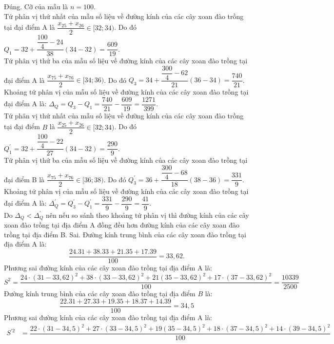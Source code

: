\begin{ex}
{\begin{itemchoice}
			\itemch Đúng. Cỡ của mẫu là ${n}=100$. \\
			Tứ phân vị thứ nhất của mẫu số liệu về đường kính của các cây xoan đào trồng tại đại điểm A là $\dfrac{{x}_{25}+{x}_{26}}{2} \in[32 ; 34)$. Do đó ${Q}_{1}=32+\dfrac{\dfrac{100}{4}-24}{38}(34-32)=\dfrac{609}{19}$. \\
			Tứ phân vị thứ ba của mẫu số liệu về đường kính của các cây xoan đào trồng tại đại điểm A là $\dfrac{{x}_{75}+{x}_{76}}{2} \in[34 ; 36)$. Do đó ${Q}_{3}=34+\dfrac{\dfrac{300}{4}-62}{21}(36-34)=\dfrac{740}{21}$. \\
			Khoảng tứ phân vị của mẫu số liệu về đường kính của các cây xoan đào trồng tại đại điểm A là:
			$\Delta_{Q}=Q_{3}-Q_{1}=\dfrac{740}{21}-\dfrac{609}{19}=\dfrac{1271}{399}$.\\
			Tứ phân vị thứ nhất của mẫu số liệu về đường kính của các cây xoan đào trồng tại đại điểm $B$ là $\dfrac{{x}_{25}+{x}_{26}}{2} \in[32 ; 34)$. Do đó ${Q}_{1}^{\prime}=32+\dfrac{\dfrac{100}{4}-22}{27}(34-32)=\dfrac{290}{9}$. \\
			Tứ phân vị thứ ba của mẫu số liệu về đường kính của các cây xoan đào trồng tại đại điểm B là $\dfrac{{x}_{75}+{x}_{76}}{2} \in[36 ; 38)$. Do đó ${Q}_{3}^{\prime}=36+\dfrac{\dfrac{300}{4}-68}{18}(38-36)=\dfrac{331}{9}$.\\
			Khoảng tứ phân vị của mẫu số liệu về đường kính của các cây xoan đào trồng tại đại điểm A là: $\Delta_{Q}^{\prime}={Q}_{3}^{\prime}-{Q}_{1}^{\prime}=\dfrac{331}{9}-\dfrac{290}{9}=\dfrac{41}{9}$.\\
			Do $\Delta_{Q}<\Delta_{Q}^{\prime}$ nên nếu so sánh theo khoảng tứ phân vị thì đường kính của các cây xoan đào trồng tại địa điểm A đồng đều hơn đường kính của các cây xoan đào trồng tại địa điểm B.
			\itemch Sai. Đường kính trung bình của các cây xoan đào trồng tại địa điểm A là:
			$$
			\dfrac{24.31+38.33+21.35+17.39}{100}=33{,}62 .
			$$
			Phương sai đường kính của các cây xoan đào trồng tại địa điểm A là:
			$$
			S^{2}=\dfrac{24 \cdot(31-33{,}62)^{2}+38 \cdot(33-33{,}62)^{2}+21(35-33{,}62)^{2}+17 \cdot(37-33{,}62)^{2}}{100}=\dfrac{10339}{2500}
			$$
			Đường kính trung bình của các cây xoan đào trồng tại địa điểm $B$ là:
			$$
			\dfrac{22.31+27.33+19.35+18.37+14.39}{100}=34{,}5
			$$
			Phương sai đường kính của các cây xoan đào trồng tại địa điểm A là:
			\begin{align*}
				S^{\prime 2}&=\dfrac{22 \cdot(31-34{,}5)^{2}+27 \cdot(33-34{,}5)^{2}+19(35-34{,}5)^{2}+18 \cdot(37-34{,}5)^{2}+14 \cdot(39-34{,}5)^{2}}{100}\\

\end{align*}
\end{itemchoice}}
\end{ex}
